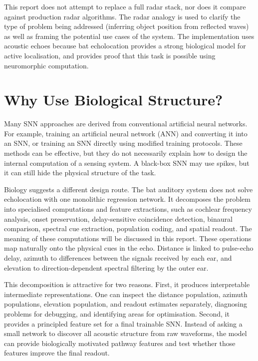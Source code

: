 This report does not attempt to replace a full radar stack, nor does it compare against production radar algorithms. The radar analogy is used to clarify the type of problem being addressed (inferring object position from reflected waves) as well as framing the potential use cases of the system. The implementation uses acoustic echoes because bat echolocation provides a strong biological model for active localisation, and provides proof that this task is possible using neuromorphic computation.

\section{Why Use Biological Structure?}

Many SNN approaches are derived from conventional artificial neural networks. For example, training an artificial neural network (ANN) and converting it into an SNN, or training an SNN directly using modified training protocols. These methods can be effective, but they do not necessarily explain how to design the internal computation of a sensing system. A black-box SNN may use spikes, but it can still hide the physical structure of the task.

Biology suggests a different design route. The bat auditory system does not solve echolocation with one monolithic regression network. It decomposes the problem into specialised computations and feature extractions, such as cochlear frequency analysis, onset preservation, delay-sensitive coincidence detection, binaural comparison, spectral cue extraction, population coding, and spatial readout. The meaning of these computations will be discussed in this report. These operations map naturally onto the physical cues in the echo. Distance is linked to pulse-echo delay, azimuth to differences between the signals received by each ear, and elevation to direction-dependent spectral filtering by the outer ear.

This decomposition is attractive for two reasons. First, it produces interpretable intermediate representations. One can inspect the distance population, azimuth populations, elevation population, and readout estimates separately, diagnosing problems for debugging, and identifying areas for optimisation. Second, it provides a principled feature set for a final trainable SNN. Instead of asking a small network to discover all acoustic structure from raw waveforms, the model can provide biologically motivated pathway features and test whether those features improve the final readout.

